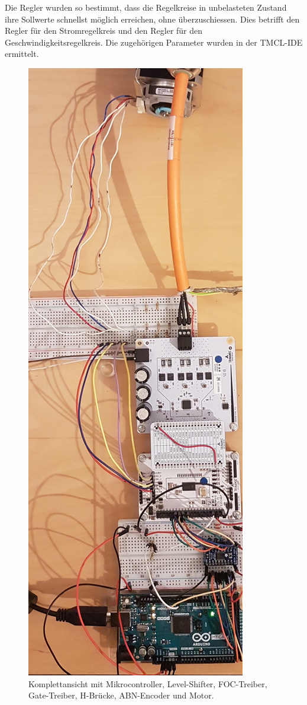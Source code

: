 Die Regler wurden so bestimmt, dass die Regelkreise in unbelasteten Zustand ihre Sollwerte schnellst möglich erreichen, ohne überzuschiessen. Dies betrifft den Regler für den Stromregelkreis und den Regler für den Geschwindigkeitsregelkreis. Die zugehörigen Parameter wurden in der TMCL-IDE ermittelt. 

\begin{figure}[H]
	\centering
	\includegraphics[angle = 270, width=\textwidth]{graphics/4_komplett}
	\caption{Komplettansicht mit Mikrocontroller, Level-Shifter, FOC-Treiber, Gate-Treiber, H-Brücke, ABN-Encoder und Motor.}
	\label{fig:4_komplett}
\end{figure}

